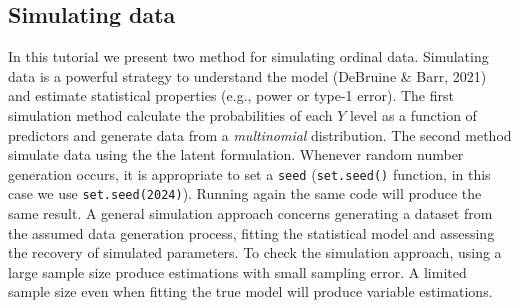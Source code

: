 \documentclass[
  man,floatsintext]{apa6}
\newenvironment{Shaded}{\begin{snugshade}}{\end{snugshade}}
\newcommand{\AttributeTok}[1]{\textcolor[rgb]{0.13,0.29,0.53}{#1}}
\newcommand{\CommentTok}[1]{\textcolor[rgb]{0.56,0.35,0.01}{\textit{#1}}}
\newcommand{\DecValTok}[1]{\textcolor[rgb]{0.00,0.00,0.81}{#1}}
\newcommand{\FunctionTok}[1]{\textcolor[rgb]{0.13,0.29,0.53}{\textbf{#1}}}
\newcommand{\NormalTok}[1]{#1}
\newcommand{\OtherTok}[1]{\textcolor[rgb]{0.56,0.35,0.01}{#1}}
\newcommand{\SpecialCharTok}[1]{\textcolor[rgb]{0.81,0.36,0.00}{\textbf{#1}}}
\newcommand{\StringTok}[1]{\textcolor[rgb]{0.31,0.60,0.02}{#1}}
\begin{document}
\begin{Shaded}
\end{Shaded}

\normalsize

\subsection{Simulating data}\label{simulating-data}

In this tutorial we present two method for simulating ordinal data. Simulating data is a powerful strategy to understand the model (DeBruine \& Barr, 2021) and estimate statistical properties (e.g., power or type-1 error). The first simulation method calculate the probabilities of each \(Y\) level as a function of predictors and generate data from a \emph{multinomial} distribution. The second method simulate data using the the latent formulation. Whenever random number generation occurs, it is appropriate to set a \texttt{seed} (\texttt{set.seed()} function, in this case we use \texttt{set.seed(2024)}). Running again the same code will produce the same result. A general simulation approach concerns generating a dataset from the assumed data generation process, fitting the statistical model and assessing the recovery of simulated parameters. To check the simulation approach, using a large sample size produce estimations with small sampling error. A limited sample size even when fitting the true model will produce variable estimations.
\end{document}
